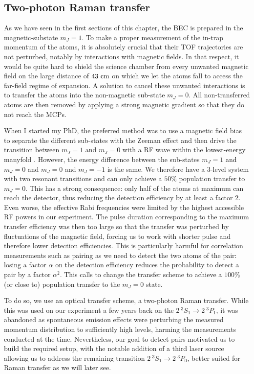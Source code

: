 \subsection{Two-photon Raman transfer}

\label{sec:raman}

As we have seen in the first sections of this chapter, the BEC is prepared in the magnetic-substate $m_J=1$. To make a proper measurement of the in-trap momentum of the atoms, it is absolutely crucial that their TOF trajectories are not perturbed, notably by interactions with magnetic fields. In that respect, it would be quite hard to shield the science chamber from every unwanted magnetic field on the large distance of $43 \ \rm{cm}$ on which we let the atoms fall to access the far-field regime of expansion. A solution to cancel these unwanted interactions is to transfer the atoms into the non-magnetic sub-state $m_J=0$. All non-transferred atoms are then removed by applying a strong magnetic gradient so that they do not reach the MCPs.

When I started my PhD, the preferred method was to use a magnetic field bias to separate the different sub-states with the Zeeman effect and then drive the transition between $m_J=1$ and $m_J=0$ with a RF wave within the lowest-energy manyfold \cite{carcy_these,cayla_these}. However, the energy difference between the sub-states $m_J=1$ and $m_J=0$ and $m_J=0$ and $m_J=-1$ is the same. We therefore have a 3-level system with two resonant transitions and can only achieve a $50\%$ population transfer to $m_J=0$. This has a strong consequence: only half of the atoms at maximum can reach the detector, thus reducing the detection efficiency by at least a factor 2. Even worse, the effective Rabi frequencies were limited by the highest accessible RF powers in our experiment. The pulse duration corresponding to the maximum transfer efficiency was then too large so that the transfer was perturbed by fluctuations of the magnetic field, forcing us to work with shorter pulse and therefore lower detection efficiencies. This is particularly harmful for correlation measurements such as \kmk pairing as we need to detect the two atoms of the pair: losing a factor $\alpha$ on the detection efficiency reduces the probability to detect a \kmk pair by a factor $\alpha^2$. This calls to change the transfer scheme to achieve a $100\%$ (or close to) population transfer to the $m_J=0$ state.

To do so, we use an optical transfer scheme, a two-photon Raman transfer. While this was used on our experiment a few years back on the $2 \ ^3 S_1 \rightarrow 2 \ ^3 P_1$, it was abandoned as spontaneous emission effects were perturbing the measured momentum distribution to sufficiently high levels, harming the measurements conducted at the time. Nevertheless, our goal to detect \kmk pairs motivated us to build the required setup, with the notable addition of a third laser source allowing us to address the remaining transition $2 \ ^3 S_1 \rightarrow 2 \ ^3 P_0$, better suited for Raman transfer as we will later see.


